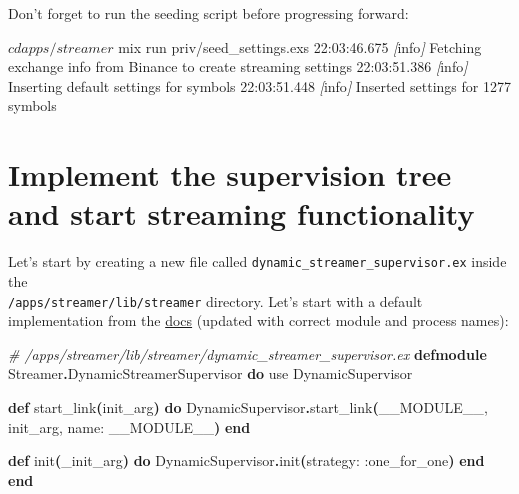 \documentclass[
  oneside]{book}
\newenvironment{Shaded}{\begin{snugshade}}{\end{snugshade}}
\newcommand{\CommentTok}[1]{\textcolor[rgb]{0.56,0.35,0.01}{\textit{#1}}}
\newcommand{\ConstantTok}[1]{\textcolor[rgb]{0.56,0.35,0.01}{#1}}
\newcommand{\ExtensionTok}[1]{#1}
\newcommand{\FunctionTok}[1]{\textcolor[rgb]{0.13,0.29,0.53}{\textbf{#1}}}
\newcommand{\ImportTok}[1]{#1}
\newcommand{\KeywordTok}[1]{\textcolor[rgb]{0.13,0.29,0.53}{\textbf{#1}}}
\newcommand{\NormalTok}[1]{#1}
\newcommand{\OperatorTok}[1]{\textcolor[rgb]{0.81,0.36,0.00}{\textbf{#1}}}
\newcommand{\PreprocessorTok}[1]{\textcolor[rgb]{0.56,0.35,0.01}{\textit{#1}}}
\newcommand{\SpecialStringTok}[1]{\textcolor[rgb]{0.31,0.60,0.02}{#1}}
\newcommand{\VariableTok}[1]{\textcolor[rgb]{0.00,0.00,0.00}{#1}}
\begin{document}
Don't forget to run the seeding script before progressing forward:

\begin{Shaded}
\begin{Highlighting}[]
\ExtensionTok{$}\NormalTok{ cd apps/streamer}
\ExtensionTok{$}\NormalTok{ mix run priv/seed\_settings.exs}
\ExtensionTok{22:03:46.675} \PreprocessorTok{[}\SpecialStringTok{info}\PreprocessorTok{]}\NormalTok{  Fetching exchange info from Binance to create streaming settings}
\ExtensionTok{22:03:51.386} \PreprocessorTok{[}\SpecialStringTok{info}\PreprocessorTok{]}\NormalTok{  Inserting default settings for symbols}
\ExtensionTok{22:03:51.448} \PreprocessorTok{[}\SpecialStringTok{info}\PreprocessorTok{]}\NormalTok{  Inserted settings for 1277 symbols}
\end{Highlighting}
\end{Shaded}

\section{Implement the supervision tree and start streaming functionality}\label{implement-the-supervision-tree-and-start-streaming-functionality}

Let's start by creating a new file called \texttt{dynamic\_streamer\_supervisor.ex} inside the\\
\texttt{/apps/streamer/lib/streamer} directory. Let's start with a default implementation from the \href{https://hexdocs.pm/elixir/master/DynamicSupervisor.html\#module-module-based-supervisors}{docs} (updated with correct module and process names):

\begin{Shaded}
\begin{Highlighting}[]
\CommentTok{\# /apps/streamer/lib/streamer/dynamic\_streamer\_supervisor.ex}
\KeywordTok{defmodule} \ConstantTok{Streamer}\OperatorTok{.}\ConstantTok{DynamicStreamerSupervisor} \KeywordTok{do}
  \ImportTok{use} \ConstantTok{DynamicSupervisor}

  \KeywordTok{def}\NormalTok{ start\_link}\FunctionTok{(}\NormalTok{init\_arg}\FunctionTok{)} \KeywordTok{do}
    \ConstantTok{DynamicSupervisor}\OperatorTok{.}\NormalTok{start\_link}\FunctionTok{(}\ConstantTok{\_\_MODULE\_\_}\NormalTok{, init\_arg, }\VariableTok{name:} \ConstantTok{\_\_MODULE\_\_}\FunctionTok{)}
  \KeywordTok{end}

  \KeywordTok{def}\NormalTok{ init}\FunctionTok{(}\NormalTok{\_init\_arg}\FunctionTok{)} \KeywordTok{do}
    \ConstantTok{DynamicSupervisor}\OperatorTok{.}\NormalTok{init}\FunctionTok{(}\VariableTok{strategy:} \VariableTok{:one\_for\_one}\FunctionTok{)}
  \KeywordTok{end}
\KeywordTok{end}
\end{Highlighting}
\end{Shaded}
\end{document}
